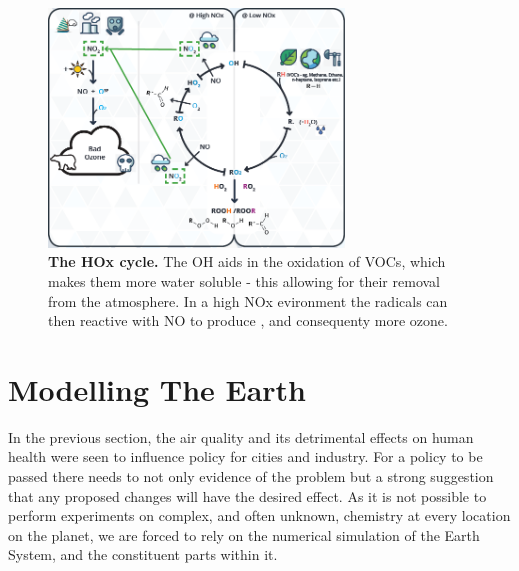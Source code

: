 \begin{figure}[H]
    \centering
    \includegraphics[width=0.7\textwidth]{hoxcycle.png}
    \caption{\textbf{The HOx cycle.} The OH aids in the oxidation of VOCs, which makes them more water soluble - this allowing for their removal from the atmosphere. In a high NOx evironment the  radicals can then reactive with NO to produce , and consequenty more ozone.}
    \label{fig:hox}
\end{figure}

\section{Modelling The Earth}
In the previous section, the air quality and its detrimental effects on human health were seen to influence policy for cities and industry.
For a policy to be passed there needs to not only evidence of the problem but a strong suggestion that any proposed changes will have the desired effect. As it is not possible to perform experiments on complex, and often unknown, chemistry at every location on the planet, we are forced to rely on the numerical simulation of the Earth System, and the constituent parts within it.

